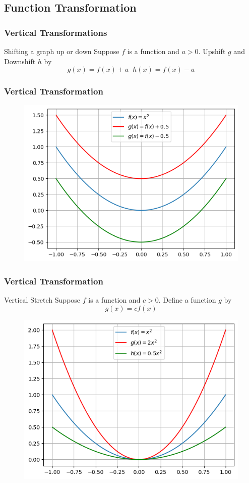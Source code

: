 \documentclass{beamer}
\begin{document}
\subsection{Function Transformation}
\begin{frame}
  \frametitle{Vertical Transformations}

  \begin{block}{Shifting a graph up or down}
    Suppose \(f \) is a function and \(a > 0\). Upshift \(g\) and  Downshift \(h\) by
\[g(x) = f (x) + a \;\; h(x) = f (x) - a \]
  \end{block}
  \frametitle{Vertical Transformation}
  \begin{figure}[h]    
    \centering
    \includegraphics[scale=0.4]{vertical_shift.png}
    \end{figure}
\end{frame}


\begin{frame}
  \frametitle{Vertical Transformation}
  \begin{block}{Vertical Stretch}
    Suppose \(f\) is a function and \(c > 0\). Define a function \(g\) by
\[g(x) = c f (x)\]
  \end{block}
  \begin{figure}[h]    
    \centering
    \includegraphics[scale=0.5]{vertical_stretch.png}
    \end{figure}
\end{frame}
\end{document}
